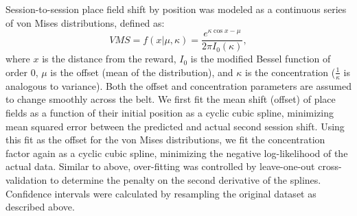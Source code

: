 Session-to-session place field shift by position was modeled as a continuous series of von Mises distributions, defined as:
$$VMS = f(x|\mu,\kappa) = \frac{e^{\kappa\cos x-\mu }}{2\pi I_0(\kappa)},$$
where $x$ is the distance from the reward, $I_0$ is the modified Bessel function of order 0, $\mu$ is the offset (mean of the distribution), and $\kappa$ is the concentration ($\frac{1}{\kappa}$ is analogous to variance). Both the offset and concentration parameters are assumed to change smoothly across the belt. We first fit the mean shift (offset) of place fields as a function of their initial position as a cyclic cubic spline, minimizing mean squared error between the predicted and actual second session shift. Using this fit as the offset for the von Mises distributions, we fit the concentration factor again as a cyclic cubic spline, minimizing the negative log-likelihood of the actual data. Similar to above, over-fitting was controlled by leave-one-out cross-validation to determine the penalty on the second derivative of the splines. Confidence intervals were calculated by resampling the original dataset as described above.

